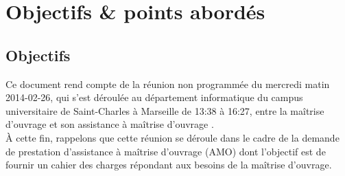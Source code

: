 \documentclass[11pt,fleqn]{report}
\begin{document}
\ZMakeCover


\chapter{Objectifs \& points abordés}

\section{Objectifs}
Ce document rend compte de la réunion non programmée du mercredi matin 2014-02-26, qui s'est déroulée au département informatique du campus universitaire de Saint-Charles à Marseille de 13:38 à 16:27, entre la maîtrise d'ouvrage \mo et son assistance à maîtrise d'ouvrage \amo.
\\
À cette fin, rappelons que cette réunion se déroule dans le cadre de la demande de prestation d'assistance à maîtrise d'ouvrage (AMO) dont l'objectif est de fournir un cahier des charges répondant aux besoins de la maîtrise d'ouvrage.
\end{document}
